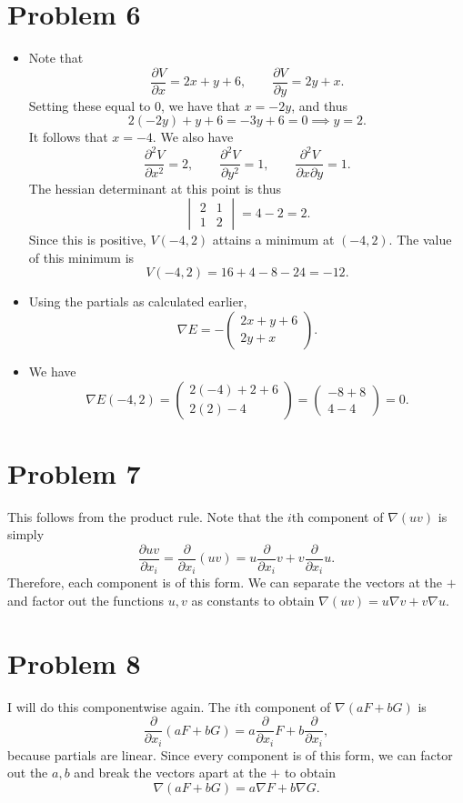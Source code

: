 \documentclass[11pt, letterpaper]{article}
\begin{document}
\section*{Problem 6}
\begin{itemize}
	\item Note that
		\[
			\frac{\partial V}{\partial x} =2x+y+6,\qquad \frac{\partial V}{\partial y} =2y+x
		.\]
		Setting these equal to $0$, we have that $x=-2y$, and thus
		\[
			2(-2y)+y+6=-3y+6=0\implies y=2
		.\]
		It follows that $x=-4$. We also have
		\[
			\frac{\partial ^2V}{\partial x^2} =2,\qquad \frac{\partial ^2V}{\partial y^2} =1,\qquad \frac{\partial ^2V}{\partial x \partial y} =1
		.\]
		The hessian determinant at this point is thus
		\[
			\begin{vmatrix}
			2 & 1 \\
			1 & 2
			\end{vmatrix}=4-2=2
		.\]
		Since this is positive, $V(-4,2)$ attains a minimum at $(-4,2)$. The value of this minimum is
		\[
			V(-4,2)=16+4-8-24=-12
		.\]
	\item Using the partials as calculated earlier,
		\[
			\nabla E=-\begin{pmatrix}
			2x+y+6 \\
			2y+x
			\end{pmatrix}
		.\]
	\item We have
		\[
			\nabla E(-4,2)=\begin{pmatrix}
			2(-4)+2+6 \\
			2(2)-4
			\end{pmatrix}=\begin{pmatrix}
			-8+8 \\
			4-4
			\end{pmatrix}=0
		.\]
\end{itemize}

\section*{Problem 7}
This follows from the product rule. Note that the $i$th component of $\nabla (uv)$ is simply
\[
	\frac{\partial uv}{\partial x_i} =\frac{\partial }{\partial x_i} (uv)=u \frac{\partial }{\partial x_i} v+v \frac{\partial }{\partial x_i} u
.\]
Therefore, each component is of this form. We can separate the vectors at the $+$ and factor out the functions $u,v$ as constants to obtain $\nabla (uv)=u\nabla v+v\nabla u$.
\section*{Problem 8}
I will do this componentwise again. The $i$th component of $\nabla (aF+bG)$ is
\[
	\frac{\partial }{\partial x_i} \left( aF+bG \right) =a \frac{\partial }{\partial x_i} F+b \frac{\partial }{\partial x_i} 
,\]
because partials are linear. Since every component is of this form, we can factor out the $a,b$ and break the vectors apart at the $+$ to obtain
\[
	\nabla (aF+bG)=a\nabla F+b\nabla G
.\]
\end{document}
